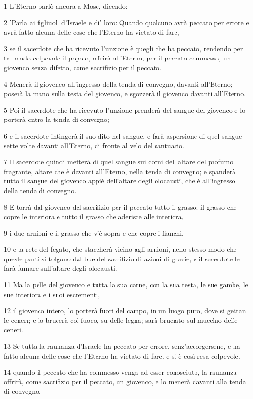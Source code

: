 \par 1 L'Eterno parlò ancora a Mosè, dicendo:
\par 2 'Parla ai figliuoli d'Israele e di' loro: Quando qualcuno avrà peccato per errore e avrà fatto alcuna delle cose che l'Eterno ha vietato di fare,
\par 3 se il sacerdote che ha ricevuto l'unzione è quegli che ha peccato, rendendo per tal modo colpevole il popolo, offrirà all'Eterno, per il peccato commesso, un giovenco senza difetto, come sacrifizio per il peccato.
\par 4 Menerà il giovenco all'ingresso della tenda di convegno, davanti all'Eterno; poserà la mano sulla testa del giovenco, e sgozzerà il giovenco davanti all'Eterno.
\par 5 Poi il sacerdote che ha ricevuto l'unzione prenderà del sangue del giovenco e lo porterà entro la tenda di convegno;
\par 6 e il sacerdote intingerà il suo dito nel sangue, e farà aspersione di quel sangue sette volte davanti all'Eterno, di fronte al velo del santuario.
\par 7 Il sacerdote quindi metterà di quel sangue sui corni dell'altare del profumo fragrante, altare che è davanti all'Eterno, nella tenda di convegno; e spanderà tutto il sangue del giovenco appiè dell'altare degli olocausti, che è all'ingresso della tenda di convegno.
\par 8 E torrà dal giovenco del sacrifizio per il peccato tutto il grasso: il grasso che copre le interiora e tutto il grasso che aderisce alle interiora,
\par 9 i due arnioni e il grasso che v'è sopra e che copre i fianchi,
\par 10 e la rete del fegato, che staccherà vicino agli arnioni, nello stesso modo che queste parti si tolgono dal bue del sacrifizio di azioni di grazie; e il sacerdote le farà fumare sull'altare degli olocausti.
\par 11 Ma la pelle del giovenco e tutta la sua carne, con la sua testa, le sue gambe, le sue interiora e i suoi escrementi,
\par 12 il giovenco intero, lo porterà fuori del campo, in un luogo puro, dove si gettan le ceneri; e lo brucerà col fuoco, su delle legna; sarà bruciato sul mucchio delle ceneri.
\par 13 Se tutta la raunanza d'Israele ha peccato per errore, senz'accorgersene, e ha fatto alcuna delle cose che l'Eterno ha vietato di fare, e si è così resa colpevole,
\par 14 quando il peccato che ha commesso venga ad esser conosciuto, la raunanza offrirà, come sacrifizio per il peccato, un giovenco, e lo menerà davanti alla tenda di convegno.
